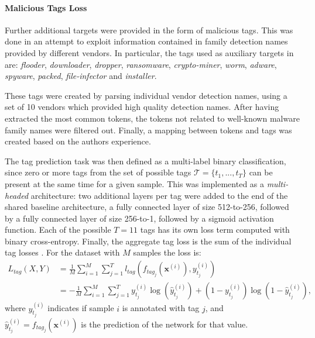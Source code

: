\documentclass[pdfa%
,cucitura%
]{toptesi}
\begin{document}
\paragraph{Malicious Tags Loss}\label{par:MaliciouTagsLoss}
Further additional targets were provided in the form of malicious tags. This was done in an attempt to exploit information contained in family detection names provided by different vendors. In particular, the tags used as auxiliary targets in \cite{ruddALOHA} are: \textit{flooder}, \textit{downloader}, \textit{dropper}, \textit{ransomware}, \textit{crypto-miner}, \textit{worm}, \textit{adware}, \textit{spyware}, \textit{packed}, \textit{file-infector} and \textit{installer}.

These tags were created by parsing individual vendor detection names, using a set of 10 vendors which provided high quality detection names. After having extracted the most common tokens, the tokens not related to well-known malware family names were filtered out. Finally, a mapping between tokens and tags was created based on the authors experience.

The tag prediction task was then defined as a multi-label binary classification, since zero or more tags from the set of possible tags $\mathcal{T} = \{t_1, ..., t_T\}$ can be present at the same time for a given sample. This was implemented as a \textit{multi-headed} architecture: two additional layers per tag were added to the end of the shared baseline architecture, a fully connected layer of size 512-to-256, followed by a fully connected layer of size 256-to-1, followed by a sigmoid activation function. Each of the possible $T=11$ tags has its own loss term computed with binary cross-entropy. Finally, the aggregate tag loss is the sum of the individual tag losses \cite{ruddALOHA}. For the dataset with $M$ samples the loss is:
\begin{equation} \label{eq:alohaMalwareTagLoss}
	\begin{split}
		L_{tag}(X,Y) & = \frac{1}{M} \sum_{i = 1}^{M} \sum_{j = 1}^{T} l_{tag}(f_{tag_j}(\textbf{x}^{(i)}), y_{t_j}^{(i)}) \\ & = - \frac{1}{M} \sum_{i = 1}^{M} \sum_{j = 1}^{T} y_{t_j}^{(i)} \log(\hat{y}_{t_j}^{(i)}) + (1 - y_{t_j}^{(i)}) \log(1 - \hat{y}_{t_j}^{(i)}),
	\end{split}
\end{equation}
where $y_{t_j}^{(i)}$ indicates if sample $i$ is annotated with tag $j$, and $\hat{y}_{t_j}^{(i)} = f_{tag_j}(\textbf{x}^{(i)})$ is the prediction of the network for that value.
\end{document}
